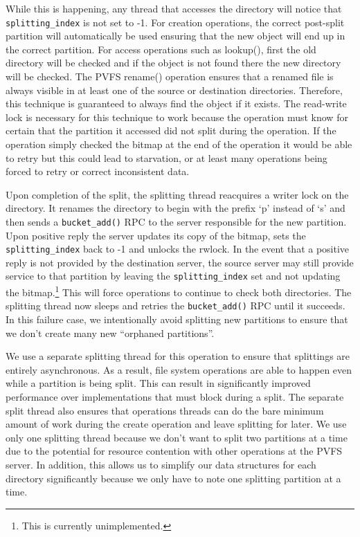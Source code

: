 \documentclass[letterpaper]{article}
\newcommand{\code}[1]{\texttt{#1}}
\begin{document}
While this is happening, any thread that accesses the directory will notice that
\code{splitting\_\-index} is not set to -1.  For creation operations, the
correct post-split partition will automatically be used ensuring that the new
object will end up in the correct partition.  For access operations such as
lookup(), first the old directory will be checked and if the object is not
found there the new directory will be checked.  The PVFS rename() operation
ensures that a renamed file is always visible in at least one of the source or
destination directories.  Therefore, this technique is guaranteed to always
find the object if it exists.  The read-write lock is necessary for this technique to
work because the operation must know for certain that the partition it
accessed did not split during the operation.  If the operation simply checked
the bitmap at the end of the operation it would be able to retry but this
could lead to starvation, or at least many operations being forced to retry or
correct inconsistent data.

Upon completion of the split, the splitting thread reacquires a writer lock on
the directory.  It renames the directory to begin with the prefix `p' instead of
`s' and then sends a \code{bucket\_\-add()} RPC to the server responsible for the new
partition.  Upon positive reply the server updates its copy of the bitmap, sets
the \code{splitting\_\-index} back to -1 and unlocks the rwlock.  In the event that
a positive reply is not provided by the destination server, the source server
may still provide service to that partition by leaving the
\code{splitting\_\-index} set and not updating the bitmap.\footnote{This is
currently unimplemented.}  This will force operations to continue to check
both directories.  The splitting thread now sleeps and retries the
\code{bucket\_\-add()} RPC until it succeeds.  In this failure case, we
intentionally avoid splitting new partitions to ensure that we don't create
many new ``orphaned partitions''.

We use a separate splitting thread for this operation to ensure that splittings
are entirely asynchronous.  As a result, file system operations are able to
happen even while a partition is being split.  This can result in significantly
improved performance over implementations that must block during a split.  The
separate split thread also ensures that operations threads can do the bare
minimum amount of work during the create operation and leave splitting for
later.  We use only one splitting thread because we don't want to split two
partitions at a time due to the potential for resource contention with other
operations at the PVFS server.  In addition, this allows us to simplify our data
structures for each directory significantly because we only have to note one
splitting partition at a time.
\end{document}
